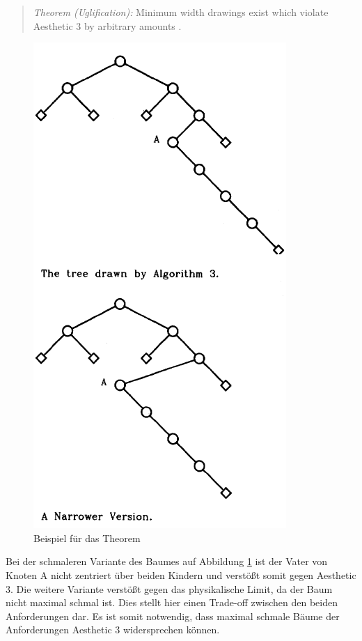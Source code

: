 \begin{quotation}
	\textit{Theorem (Uglification):} Minimum width drawings exist which violate Aesthetic 3 by arbitrary amounts \cite[S. 519]{q1}.
\end{quotation}

\begin{figure}[H]
    \centering
    \includegraphics[scale = 0.75]{abbildungen/baum_theorem_uglification}
    \caption{Beispiel für das Theorem \cite[S. 519]{q1}}
    \label{pic:baum_theorem_uglification} 
\end{figure}

Bei der schmaleren Variante des Baumes auf Abbildung \ref{pic:baum_theorem_uglification} ist der Vater von Knoten A nicht zentriert
über beiden Kindern und verstößt somit gegen Aesthetic 3. Die weitere Variante verstößt gegen das physikalische Limit, da der Baum nicht
maximal schmal ist. Dies stellt hier einen Trade-off zwischen den beiden Anforderungen dar. Es ist somit notwendig, dass maximal schmale Bäume der
Anforderungen Aesthetic 3 widersprechen können. 

